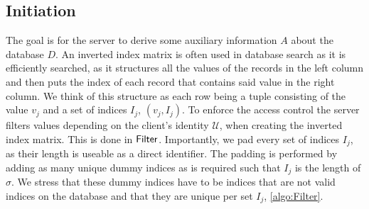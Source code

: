 \subsection*{\thesubsection\quad Initiation}\label{subsec:KeywordSearchInitiation}

The goal is for the server to derive some auxiliary information $ A $ about the database $ D $. An inverted index matrix is often used in database search as it is efficiently searched, as it structures all the values of the records in the left column and then puts the index of each record that contains said value in the right column. We think of this structure as each row being a tuple consisting of the value $ v_j $ and a set of indices $ I_j $, $ \left( v_j , I_{j} \right) $. To enforce the access control the server filters values depending on the client's identity $ \mathcal{U}$, when creating the inverted index matrix. This is done in $ \mathsf{{Filter}} $. Importantly, we pad every set of indices $ I_j $, as their length is useable as a direct identifier. The padding is performed by adding as many unique dummy indices as is required such that $ I_j $ is the length of $ \sigma $. We stress that these dummy indices have to be indices that are not valid indices on the database and that they are unique per set $ I_j $, \cref{algo:Filter}.

\hfill

